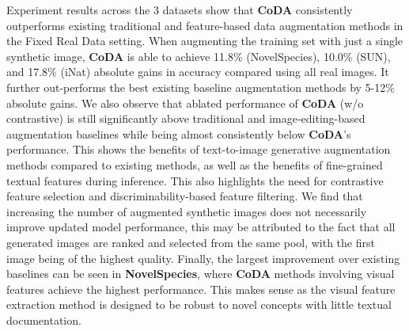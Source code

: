 Experiment results across the 3 datasets show that \textbf{CoDA} consistently outperforms existing traditional and feature-based data augmentation methods in the Fixed Real Data setting. When augmenting the training set with just a single synthetic image, \textbf{CoDA} is able to achieve 11.8\% (NovelSpecies), 10.0\% (SUN), and 17.8\% (iNat) absolute gains in accuracy compared using all real images. It further out-performs the best existing baseline augmentation methods by 5-12\% absolute gains. We also observe that ablated performance of \textbf{CoDA} (w/o
contrastive) is still significantly above traditional and image-editing-based augmentation baselines while being almost consistently below \textbf{CoDA}'s performance. This shows the benefits of text-to-image generative augmentation methods compared to existing methods, as well as the benefits of fine-grained textual features during inference. This also highlights the need for contrastive feature selection and discriminability-based feature filtering. We find that increasing the number of augmented synthetic images does not necessarily improve updated model performance, this may be attributed to the fact that all generated images are ranked and selected from the same pool, with the first image being of the highest quality. Finally, the largest improvement over existing baselines can be seen in \textbf{NovelSpecies}, where \textbf{CoDA} methods involving visual features achieve the highest performance. This makes sense as the visual feature extraction method is designed to be robust to novel concepts with little textual documentation.



\vspace{-0.5em}

